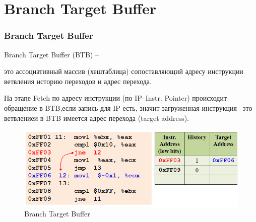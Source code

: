 \documentclass{beamer}
\begin{document}
\section{Branch Target Buffer}

\begin{frame}
\frametitle{Branch Target Buffer}

\begin{block}{Branch Target Buffer (BTB) –}

это ассоциативный массив (хештаблица) сопоставляющий адресу инструкции ветвления историю переходов и адрес перехода.
\end{block}

На этапе Fetch по адресу инструкции (по IP–Instr. Pointer) происходит обращение в BTB,если запись для IP есть, значит загруженная инструкция –это ветвлениеи в BTB имеется адрес перехода (target address).

\begin{figure}
\includegraphics[scale=0.5]{Pic_2}
\caption{Branch Target Buffer}
\end{figure}

\end{frame}

\end{document}
